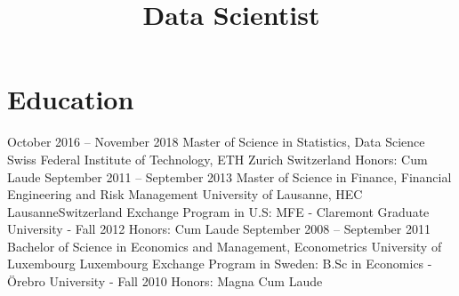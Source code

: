 \documentclass[11pt,a4paper,sans]{moderncv}
\title{Data Scientist}
\begin{document}
\makecvtitle %
\vspace*{-10mm}


\section{\LARGE{Education}}
\vspace{2mm}
\cventry
	{October 2016 -- November 2018}
	{Master of Science in Statistics, Data Science}
	{Swiss Federal Institute of Technology, ETH Zurich}
	{Switzerland}{}
	{Honors: Cum Laude} %
\vspace{2mm}
\cventry
	{September 2011 -- September 2013}
	{Master of Science in Finance, Financial Engineering and Risk Management}
	{University of Lausanne, HEC Lausanne}{Switzerland}{}
	{Exchange Program in U.S: MFE - Claremont Graduate University - Fall 2012
	\newline Honors: Cum Laude} %
\vspace{2mm}
\cventry
	{September 2008 -- September 2011}
	{Bachelor of Science in Economics and Management, Econometrics}
	{University of Luxembourg}
	{Luxembourg}{}
	{Exchange Program in Sweden: B.Sc in Economics - Örebro University - Fall 2010
	\newline  Honors: Magna Cum Laude} %
\end{document}
